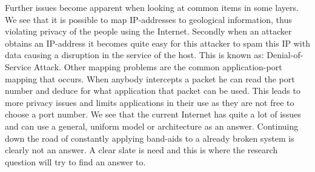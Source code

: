 \npar
Further issues become apparent when looking at common items in some layers. We see that it is possible to map IP-addresses to geological information, thus violating privacy of the people using the Internet. Secondly when an attacker obtains an IP-address it becomes quite easy for this attacker to spam this IP with data causing a disruption in the service of the host. This is known as: Denial-of-Service Attack. Other mapping problems are the common application-port mapping that occurs. When anybody intercepts a packet he can read the port number and deduce for what application that packet can be used. This leads to more privacy issues and limits applications in their use as they are not free to choose a port number. 
\npar
We see that the current Internet has quite a lot of issues and can use a general, uniform model or architecture as an answer. Continuing down the road of constantly applying band-aids to a already broken system is clearly not an answer. A clear slate is need and this is where the research question will try to find an answer to. 

